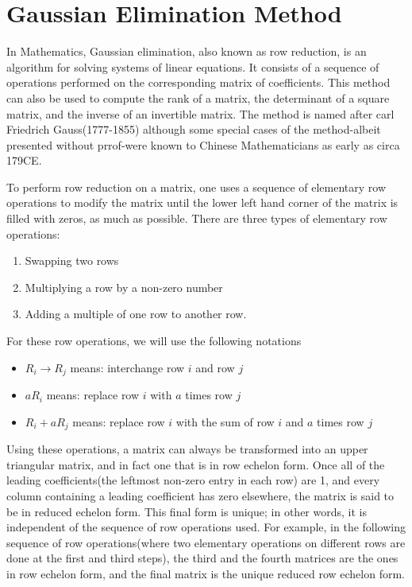 \documentclass[a4paper, 12pt]{report}
\begin{document}
{     \section{Gaussian Elimination Method}
     In Mathematics, Gaussian elimination, also known as row reduction, is an algorithm for solving systems of linear equations. It consists of a sequence of operations performed on the corresponding matrix of coefficients. This method can also be used to compute the rank of a matrix, the determinant of a square matrix, and the inverse of an invertible matrix. The method is named after carl Friedrich Gauss(1777-1855) although some special cases of the method-albeit presented without prrof-were known to Chinese Mathematicians as early as circa 179CE.
     
     To perform row reduction on a matrix, one uses a sequence of elementary row operations to modify the matrix until the lower left hand corner of the matrix is filled with zeros, as much as possible. There are three types of elementary row operations:
     \begin{enumerate}
     	\item Swapping two rows
     	\item Multiplying a row by a non-zero number
     	\item Adding a multiple of one row to another row.
     \end{enumerate}    
     For these row operations, we will use the following notations
     \begin{itemize}
     	\item $R_i\to R_j$ means: interchange row $i$ and row $j$
     	\item $aR_i$ means: replace row $i$ with $a$ times row $j$
     	\item $R_i+aR_j$ means: replace row $i$ with the sum of row $i$ and $a$ times row $j$
     \end{itemize}
     Using these operations, a matrix can always be transformed into an upper triangular matrix, and in fact one that is in row echelon form. Once all of the leading coefficients(the leftmost non-zero entry in each row) are 1, and every column containing a leading coefficient has zero elsewhere, the matrix is said to be in reduced echelon form. This final form is unique; in other words, it is independent of the sequence of row operations used. For example, in the following sequence of row operations(where two elementary operations on different rows are done at the first and third steps), the third and the fourth matrices are the ones in row echelon form, and the final matrix is the unique reduced row echelon form.
     
}
\end{document}
